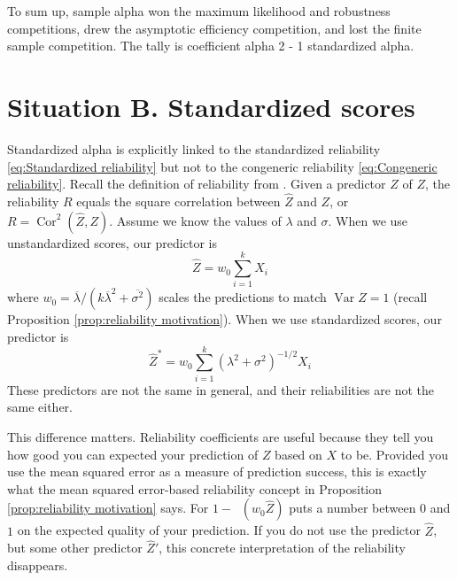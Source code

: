 \documentclass[twoside]{article}
\DeclareMathOperator{\Var}{Var}
\DeclareMathOperator{\Cor}{Cor}
\DeclareMathOperator{\MSE}{MSE_Z}
\begin{document}
To sum up, sample alpha won the maximum likelihood and robustness competitions, drew the asymptotic efficiency competition, and lost the finite sample competition. The tally is coefficient alpha 2 - 1 standardized alpha. 

\section{Situation B. Standardized scores}
\label{sec:argument B}

Standardized alpha is explicitly linked to the standardized reliability \eqref{eq:Standardized reliability} but not to the congeneric reliability \eqref{eq:Congeneric reliability}. Recall the definition of reliability from
. Given a predictor $\hat{Z}$ of $Z$, the
reliability $ R$ equals the square correlation between $\hat{Z}$
and $Z$, or $ R=\Cor^{2}(\hat{Z},Z)$. Assume
we know the values of $\lambda$ and $\sigma$. When we use unstandardized
scores, our predictor is 
\begin{equation}
\hat{Z}=w_{0}\sum_{i=1}^{k}X_{i}\label{eq:sum score}
\end{equation}
where $w_{0}=\overline{\lambda}/(k\overline{\lambda}^{2}+\overline{\sigma^{2}})$ scales the predictions to match $\Var Z=1$ (recall Proposition \ref{prop:reliability motivation}). When we use standardized
scores, our predictor is
\begin{equation}
\hat{Z}^{*}=w_{0}\sum_{i=1}^{k}(\lambda^{2}+\sigma^{2})^{-1/2}X_{i}\label{eq:standardized sum score}
\end{equation}
These predictors are not the same in general, and their reliabilities are not
the same either.

This difference matters. Reliability coefficients are useful because they tell you how good you can expected your prediction of $Z$ based on $X$ to be. Provided you use the mean squared error as a measure of prediction success, this is exactly what the mean squared error-based reliability concept in Proposition \ref{prop:reliability motivation} says. For $1 - \MSE(w_0\hat{Z})$ puts a number between $0$ and $1$ on the expected quality of your prediction. If you do not use the predictor $\hat{Z}$, but some other predictor $\hat{Z}'$, this concrete interpretation of the reliability disappears. 
\end{document}
